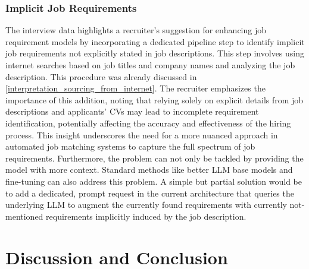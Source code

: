 \documentclass[draft,final]{thesisclass} %
\begin{document}
\subsection{Implicit Job Requirements}
The interview data highlights a recruiter's suggestion for enhancing job requirement models by incorporating a dedicated pipeline step to identify implicit job requirements not explicitly stated in job descriptions. This step involves using internet searches based on job titles and company names and analyzing the job description. This procedure was already discussed in \ref{interpretation_sourcing_from_internet}. The recruiter emphasizes the importance of this addition, noting that relying solely on explicit details from job descriptions and applicants' \acs{CV}s may lead to incomplete requirement identification, potentially affecting the accuracy and effectiveness of the hiring process. This insight underscores the need for a more nuanced approach in automated job matching systems to capture the full spectrum of job requirements.
Furthermore, the problem can not only be tackled by providing the model with more context. Standard methods like better \gls{LLM} base models and fine-tuning can also address this problem. A simple but partial solution would be to add a dedicated, prompt request in the current architecture that queries the underlying \gls{LLM} to augment the currently found requirements with currently not-mentioned requirements implicitly induced by the job description.

\chapter{Discussion and Conclusion} \label{discussion_and_conclusion}
\end{document}
